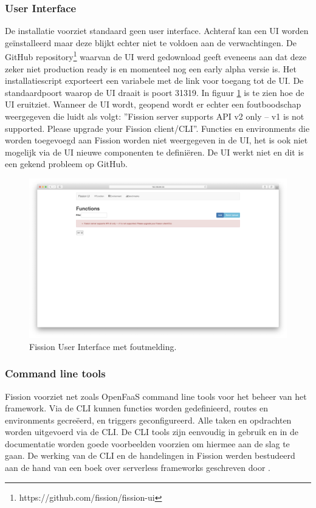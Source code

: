 \subsubsection{User Interface}
De installatie voorziet standaard geen user interface. Achteraf kan een UI worden geïnstalleerd maar deze blijkt echter niet te voldoen aan de verwachtingen. De GitHub repository\footnote{https://github.com/fission/fission-ui} waarvan de UI werd gedownload geeft eveneens aan dat deze zeker niet production ready is en momenteel nog een early alpha versie is. Het installatiescript exporteert een variabele met de link voor toegang tot de UI. De standaardpoort waarop de UI draait is poort 31319. In figuur \ref{fig:fission-ui} is te zien hoe de UI eruitziet. Wanneer de UI wordt, geopend wordt er echter een foutboodschap weergegeven die luidt als volgt: ''Fission server supports API v2 only -- v1 is not supported. Please upgrade your Fission client/CLI''. Functies en environments die worden toegevoegd aan Fission worden niet weergegeven in de UI, het is ook niet mogelijk via de UI nieuwe componenten te definiëren. De UI werkt niet en dit is een gekend probleem op GitHub.
\begin{figure}
    \includegraphics[width=1\textwidth]{img/fission-ui.png}
    \caption{Fission User Interface met foutmelding.}
    \label{fig:fission-ui}  
\end{figure}

\subsubsection{Command line tools}
Fission voorziet net zoals OpenFaaS command line tools voor het beheer van het framework. Via de CLI kunnen functies worden gedefinieerd, routes en environments gecreëerd, en triggers geconfigureerd. Alle taken en opdrachten worden uitgevoerd via de CLI. De CLI tools zijn eenvoudig in gebruik en in de documentatie worden goede voorbeelden voorzien om hiermee aan de slag te gaan. De werking van de CLI en de handelingen in Fission werden bestudeerd aan de hand van een boek over serverless frameworks geschreven door \textcite{McKendrick2018}.

